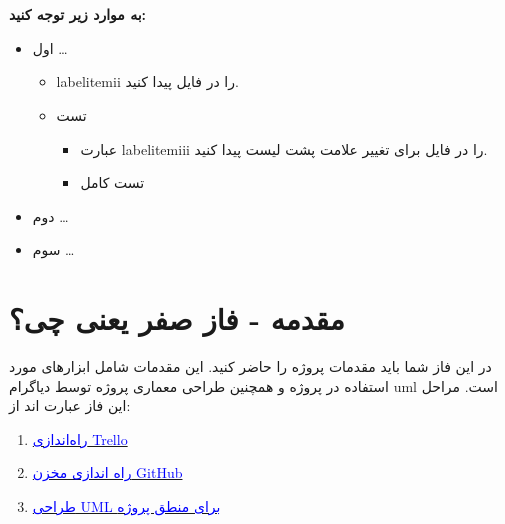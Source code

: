 \documentclass[]{article}
\begin{document}
\newpage
\pagestyle{fancy}
\fancyhf{}
\fancyfoot{}
\cfoot{\thepage}
\renewcommand{\headrulewidth}{2pt}

\KashidaOff


 \Large \textbf{\\\\
به موارد زیر توجه کنید:}

\begin{itemize} 
\item اول \dots{}
     \begin{itemize} 
        \item labelitemii را در فایل پیدا کنید.
        
        \item تست
        \begin{itemize}
        
        \item عبارت labelitemiii را در فایل برای تغییر علامت پشت لیست پیدا کنید.
        
        \item تست کامل
        \end{itemize}
        
     \end{itemize}
\item دوم \dots{}
\item سوم \dots{}
\end{itemize}




\newpage
\section* {{\titr مقدمه - فاز صفر یعنی چی؟}}
در این فاز شما باید مقدمات پروژه را حاضر کنید. این مقدمات شامل ابزارهای مورد استفاده در پروژه و همچنین طراحی معماری پروژه توسط دیاگرام uml است. مراحل این فاز عبارت اند از:

\begin{enumerate}
\item
\hyperref[subsec:trello]{\textcolor{blue}{راه‌اندازی Trello}}

\item
\hyperref[subsec:github]{\textcolor{blue}{راه اندازی مخزن GitHub}}

\item
\hyperref[subsec:uml]{\textcolor{blue}{طراحی UML برای منطق پروژه}}


\end{enumerate}
\end{document}
